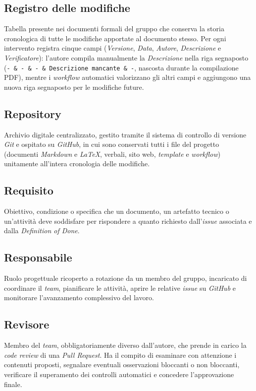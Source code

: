 \documentclass[11pt, a4paper]{article}
\begin{document}
\subsection*{Registro delle modifiche}
Tabella presente nei documenti formali del gruppo che conserva la storia cronologica di tutte le modifiche apportate al documento stesso. Per ogni intervento registra cinque campi (\textit{Versione}, \textit{Data}, \textit{Autore}, \textit{Descrizione} e \textit{Verificatore}): l'autore compila manualmente la \textit{Descrizione} nella riga segnaposto (\texttt{- \& - \& - \& Descrizione mancante \& -}, nascosta durante la compilazione PDF), mentre i \textit{workflow} automatici valorizzano gli altri campi e aggiungono una nuova riga segnaposto per le modifiche future.

\subsection*{Repository}
Archivio digitale centralizzato, gestito tramite il sistema di controllo di versione \textit{Git} e ospitato su \textit{GitHub}, in cui sono conservati tutti i file del progetto (documenti \textit{Markdown} e \textit{LaTeX}, verbali, sito web, \textit{template} e \textit{workflow}) unitamente all'intera cronologia delle modifiche.

\subsection*{Requisito}
Obiettivo, condizione o specifica che un documento, un artefatto tecnico o un'attività deve soddisfare per rispondere a quanto richiesto dall'\textit{issue} associata e dalla \textit{Definition of Done}.

\subsection*{Responsabile}
Ruolo progettuale ricoperto a rotazione da un membro del gruppo, incaricato di coordinare il \textit{team}, pianificare le attività, aprire le relative \textit{issue} su \textit{GitHub} e monitorare l'avanzamento complessivo del lavoro.

\subsection*{Revisore}
Membro del \textit{team}, obbligatoriamente diverso dall'autore, che prende in carico la \textit{code review} di una \textit{Pull Request}. Ha il compito di esaminare con attenzione i contenuti proposti, segnalare eventuali osservazioni bloccanti o non bloccanti, verificare il superamento dei controlli automatici e concedere l'approvazione finale.
\end{document}
